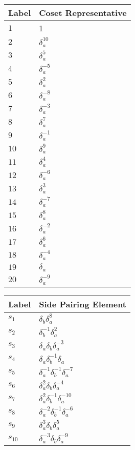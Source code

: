 \documentclass{article}
\begin{document}

\begin{center}
\begin{tabular}{ll}
\toprule
Label & Coset Representative\\
\midrule
$1$ & 1 \\
$2$ & $\delta_a^{10}$ \\
$3$ & $\delta_a^{5}$ \\
$4$ & $\delta_a^{-5}$ \\
$5$ & $\delta_a^{2}$ \\
$6$ & $\delta_a^{-8}$ \\
$7$ & $\delta_a^{-3}$ \\
$8$ & $\delta_a^{7}$ \\
$9$ & $\delta_a^{-1}$ \\
$10$ & $\delta_a^{9}$ \\
$11$ & $\delta_a^{4}$ \\
$12$ & $\delta_a^{-6}$ \\
$13$ & $\delta_a^{3}$ \\
$14$ & $\delta_a^{-7}$ \\
$15$ & $\delta_a^{8}$ \\
$16$ & $\delta_a^{-2}$ \\
$17$ & $\delta_a^{6}$ \\
$18$ & $\delta_a^{-4}$ \\
$19$ & $\delta_a^{}$ \\
$20$ & $\delta_a^{-9}$ \\
\bottomrule
\end{tabular}
\hfill
\begin{tabular}{ll}
\toprule
Label & Side Pairing Element\\
\midrule
$s_{1}$ & $\delta_b^{}\delta_a^{8}$ \\
$s_{2}$ & $\delta_b^{-1}\delta_a^{2}$ \\
$s_{3}$ & $\delta_a^{}\delta_b^{}\delta_a^{-3}$ \\
$s_{4}$ & $\delta_a^{}\delta_b^{-1}\delta_a^{}$ \\
$s_{5}$ & $\delta_a^{-1}\delta_b^{-1}\delta_a^{-7}$ \\
$s_{6}$ & $\delta_a^{2}\delta_b^{}\delta_a^{-4}$ \\
$s_{7}$ & $\delta_a^{2}\delta_b^{-1}\delta_a^{-10}$ \\
$s_{8}$ & $\delta_a^{-2}\delta_b^{-1}\delta_a^{-6}$ \\
$s_{9}$ & $\delta_a^{3}\delta_b^{}\delta_a^{5}$ \\
$s_{10}$ & $\delta_a^{-3}\delta_b^{}\delta_a^{-9}$ \\

\end{tabular}
\end{center}
\end{document}
